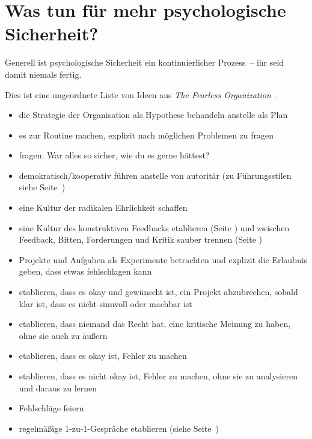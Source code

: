 \section{Was tun für mehr psychologische Sicherheit?}
\label{ws-was-tun}

Generell ist psychologische Sicherheit ein kontinuierlicher Prozess~-- ihr seid damit niemals \glqq fertig\grqq.

Dies ist eine ungeordnete Liste von Ideen aus \emph{The Fearless Organization} \cite{the-fearless-organisation}.

\begin{itemize}
  \item die Strategie der Organisation als Hypothese behandeln anstelle als Plan  
  \item es zur Routine machen, explizit nach möglichen Problemen zu fragen  
  \item fragen: \glqq War alles so sicher, wie du es gerne hättest?\grqq {}
  \item demokratisch/kooperativ führen anstelle von autoritär (zu Führungsstilen siehe Seite~\pageref{fuehrungsstile}) 
  \item eine Kultur der radikalen Ehrlichkeit \cite{radical-honesty} schaffen 
  \item eine Kultur des konstruktiven Feedbacks etablieren (Seite \pageref{feedback-regeln}) und zwischen Feedback, Bitten, Forderungen und Kritik sauber trennen  (Seite \pageref{feedback-vs-kritik})
  \item Projekte und Aufgaben als Experimente betrachten und explizit die Erlaubnis geben, dass etwas fehlschlagen kann 
  \item etablieren, dass es okay und gewünscht ist, ein Projekt abzubrechen, sobald klar ist, dass es nicht sinnvoll oder machbar ist 
  \item etablieren, dass niemand das Recht hat, eine kritische Meinung zu haben, ohne sie auch zu äußern
  \item etablieren, dass es okay ist, Fehler zu machen 
  \item etablieren, dass es nicht okay ist, Fehler zu machen, ohne sie zu analysieren und daraus zu lernen
  \item Fehlschläge feiern 
  \item regelmäßige 1-zu-1-Gespräche etablieren (siehe Seite~\pageref{1-zu-1}) 

\end{itemize}
